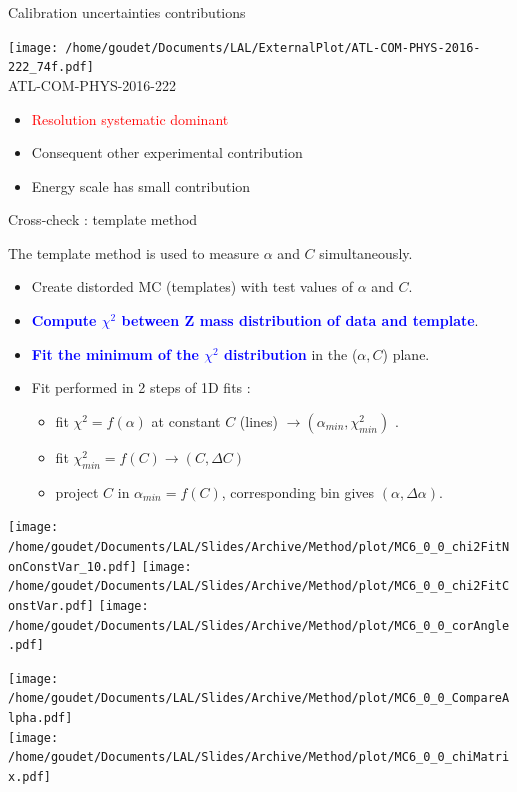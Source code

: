 \begin{frame}{Calibration uncertainties contributions}
  \begin{minipage}{0.49\linewidth}
    \texttt{[image: /home/goudet/Documents/LAL/ExternalPlot/ATL-COM-PHYS-2016-222\_74f.pdf]}\\
    \centering
    ATL-COM-PHYS-2016-222
  \end{minipage}
  \begin{minipage}{0.49\linewidth}
    \begin{itemize}
    \item \textcolor{red}{Resolution systematic dominant}
    \item Consequent other experimental contribution
    \item Energy scale has small contribution
    \end{itemize}
  \end{minipage}
\end{frame}

\begin{frame}{Cross-check : template method}
\begin{minipage}{0.59\linewidth}
  The template method is used to measure $\alpha$ and $C$ simultaneously.
\begin{itemize}
\item Create distorded MC (templates) with test values of $\alpha$ and $C$.
\item \textcolor{blue}{\bf Compute $\chi^2$ between Z mass distribution of data and template}.
\item \textcolor{blue}{\bf Fit the minimum of the $\chi^2$ distribution} in the ($\alpha,C$) plane.
\item Fit performed in 2 steps of 1D fits : 
\begin{itemize}
\item fit $\chi^2=f(\alpha)$ at constant $C$ (lines) $\rightarrow (\alpha_{min}, \chi^2_{min})$ .
\item fit $\chi^2_{min}=f(C)\rightarrow (C, \Delta C)$
\item project $C$ in $\alpha_{min}=f(C)$, corresponding bin gives $(\alpha, \Delta\alpha)$.
\end{itemize}
\end{itemize}
  \texttt{[image: /home/goudet/Documents/LAL/Slides/Archive/Method/plot/MC6\_0\_0\_chi2FitNonConstVar\_10.pdf]}
  \texttt{[image: /home/goudet/Documents/LAL/Slides/Archive/Method/plot/MC6\_0\_0\_chi2FitConstVar.pdf]}
  \texttt{[image: /home/goudet/Documents/LAL/Slides/Archive/Method/plot/MC6\_0\_0\_corAngle.pdf]}
\end{minipage}
\hfill
\begin{minipage}{0.4\linewidth}
  \texttt{[image: /home/goudet/Documents/LAL/Slides/Archive/Method/plot/MC6\_0\_0\_CompareAlpha.pdf]}\\
  \texttt{[image: /home/goudet/Documents/LAL/Slides/Archive/Method/plot/MC6\_0\_0\_chiMatrix.pdf]}\\
\end{minipage}
\end{frame}

